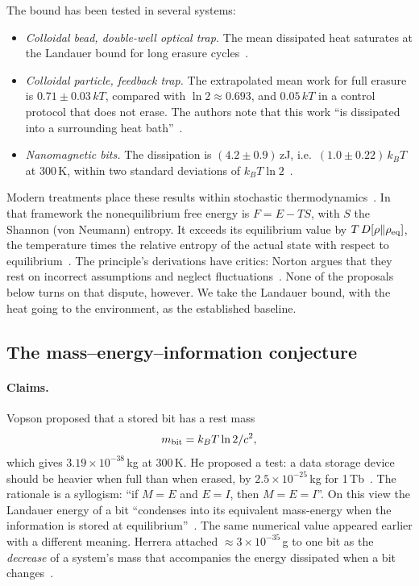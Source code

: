 The bound has been tested in several systems:
\begin{itemize}
\item \emph{Colloidal bead, double-well optical trap.} The mean dissipated heat saturates at the
  Landauer bound for long erasure cycles~\cite{Berut2012experimental}.
\item \emph{Colloidal particle, feedback trap.} The extrapolated mean work for full erasure is
  $0.71\pm0.03\,kT$, compared with $\ln 2\approx0.693$, and $0.05\,kT$ in a control protocol that
  does not erase. The authors note that this work ``is dissipated into a surrounding heat
  bath''~\cite{Jun2014high}.
\item \emph{Nanomagnetic bits.} The dissipation is $(4.2\pm0.9)$\,zJ, i.e.\
  $(1.0\pm0.22)\,k_BT$ at 300\,K, within two standard deviations of
  $k_BT\ln2$~\cite{Hong2016experimental}.
\end{itemize}
Modern treatments place these results within stochastic thermodynamics~\cite{Parrondo2015thermodynamics}.
In that framework the nonequilibrium free energy is $F=E-TS$, with $S$ the Shannon (von Neumann)
entropy. It exceeds its equilibrium value by $T\,D[\rho\Vert\rho_{\rm eq}]$, the temperature times
the relative entropy of the actual state with respect to equilibrium~\cite{Esposito2011second}.
The principle's derivations have critics: Norton argues that they rest on incorrect assumptions and
neglect fluctuations~\cite{Norton2011waiting}. None of the proposals below turns on that dispute,
however. We take the Landauer bound, with the heat going to the environment, as the established
baseline.

\subsection{The mass--energy--information conjecture}
\label{sec:information:mei}

\paragraph{Claims.}
Vopson proposed that a stored bit has a rest mass
\begin{equation}
m_{\rm bit}=k_BT\ln2/c^2,
\end{equation}
which gives $3.19\times10^{-38}$\,kg at 300\,K. He proposed a test: a data storage device should be
heavier when full than when erased, by $2.5\times10^{-25}$\,kg for 1\,Tb~\cite{Vopson2019mass}.
The rationale is a syllogism: ``if $M=E$ and $E=I$, then $M=E=I$''. On this view the Landauer
energy of a bit ``condenses into its equivalent mass-energy when the information is stored at
equilibrium''~\cite{Vopson2022second}.
The same numerical value appeared earlier with a different meaning. Herrera attached
${\approx}3\times10^{-35}$\,g to one bit as the \emph{decrease} of a system's mass that accompanies
the energy dissipated when a bit changes~\cite{Herrera2014mass}.


